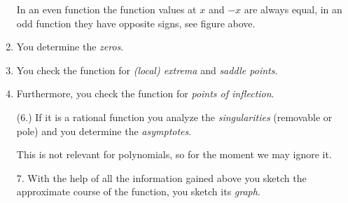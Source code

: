 \documentclass[12pt,eng]{skript_ogg}
\begin{document}
\begin{enumerate}
\begin{center}
\end{center}
In an even function the function values at $x$ and $-x$ are always equal, in an odd function they have opposite signs, see figure above.
\begin{center}
\end{center}
\item You determine the \emph{zeros}.
\item You check the function for \emph{(local) extrema} and \emph{saddle points}.
\item Furthermore, you check the function for \emph{points of inflection}.
\item[(6.)] If it is a rational function you analyze the \emph{singularities} (removable or pole) and you determine the \emph{asymptotes}.

This is not relevant for polynomials, so for the moment we may ignore it.
\item[7.] With the help of all the information gained above you sketch the approximate course of the function, you sketch its \emph{graph}.
\end{enumerate}

\newpage
\end{document}
